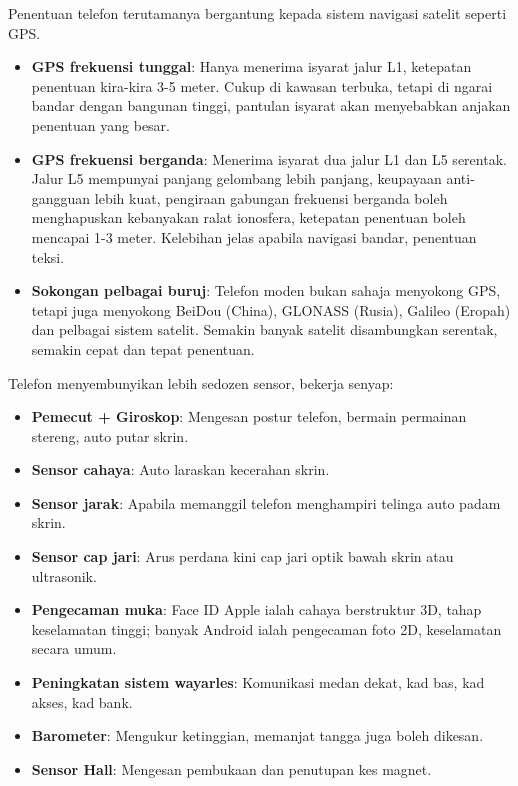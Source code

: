 
Penentuan telefon terutamanya bergantung kepada sistem navigasi satelit seperti GPS.

\begin{itemize}
  \item \textbf{GPS frekuensi tunggal}: Hanya menerima isyarat jalur L1, ketepatan penentuan kira-kira 3-5 meter. Cukup di kawasan terbuka, tetapi di ngarai bandar dengan bangunan tinggi, pantulan isyarat akan menyebabkan anjakan penentuan yang besar.
  \item \textbf{GPS frekuensi berganda}: Menerima isyarat dua jalur L1 dan L5 serentak. Jalur L5 mempunyai panjang gelombang lebih panjang, keupayaan anti-gangguan lebih kuat, pengiraan gabungan frekuensi berganda boleh menghapuskan kebanyakan ralat ionosfera, ketepatan penentuan boleh mencapai 1-3 meter. Kelebihan jelas apabila navigasi bandar, penentuan teksi.
  \item \textbf{Sokongan pelbagai buruj}: Telefon moden bukan sahaja menyokong GPS, tetapi juga menyokong BeiDou (China), GLONASS (Rusia), Galileo (Eropah) dan pelbagai sistem satelit. Semakin banyak satelit disambungkan serentak, semakin cepat dan tepat penentuan.
\end{itemize}


Telefon menyembunyikan lebih sedozen sensor, bekerja senyap:

\begin{itemize}
  \item \textbf{Pemecut + Giroskop}: Mengesan postur telefon, bermain permainan stereng, auto putar skrin.
  \item \textbf{Sensor cahaya}: Auto laraskan kecerahan skrin.
  \item \textbf{Sensor jarak}: Apabila memanggil telefon menghampiri telinga auto padam skrin.
  \item \textbf{Sensor cap jari}: Arus perdana kini cap jari optik bawah skrin atau ultrasonik.
  \item \textbf{Pengecaman muka}: Face ID Apple ialah cahaya berstruktur 3D, tahap keselamatan tinggi; banyak Android ialah pengecaman foto 2D, keselamatan secara umum.
  \item \textbf{Peningkatan sistem wayarles}: Komunikasi medan dekat, kad bas, kad akses, kad bank.
  \item \textbf{Barometer}: Mengukur ketinggian, memanjat tangga juga boleh dikesan.
  \item \textbf{Sensor Hall}: Mengesan pembukaan dan penutupan kes magnet.
\end{itemize}

